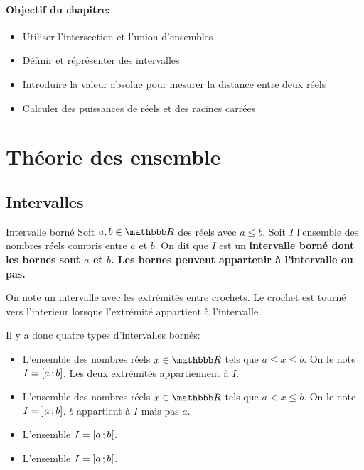 \documentclass[10pt,a4paper,openany,twoside,prof]{book}
\begin{document}
	\entetegal{}

	\vspace{-7mm}
	\paragraph*{Objectif du chapitre:}
	\begin{itemize}
		\vspace{-2mm}
		\setlength\itemsep{-1mm}
		\item Utiliser l'intersection et l'union d'ensembles
		\item Définir et réprésenter des intervalles
		\item Introduire la valeur absolue pour mesurer la distance entre deux réels
		\item Calculer des puissances de réels et des racines carrées
	\end{itemize}
	\vspace{-7mm}

\section{Théorie des ensemble}

\subsection{Intervalles}

\begin{defi}{Intervalle borné}{}
	Soit $a, b\in\R$ des réels avec $a\le b$. Soit $I$ l'ensemble des nombres réels compris entre $a$ et $b$. On dit que $I$ est un \bf{intervalle borné} dont les bornes sont $a$ et $b$. Les bornes peuvent appartenir à l'intervalle ou pas.
\end{defi}

\begin{notation}{}{}
	On note un intervalle avec les extrémités entre crochets. Le crochet est tourné vers l'interieur lorsque l'extrémité appartient à l'intervalle.

Il y a donc quatre types d'intervalles bornés:
	\begin{itemize}
		\item L'ensemble des nombres réels $x\in\R$ tels que $a\le x\le b$. On le note $I = \mathopen{[}a\mathclose{}\mathpunct{};b\mathclose{]}$. Les deux extrémités appartiennent à $I$.
		\item  L'ensemble des nombres réels $x\in\R$ tels que $a<x\le b$. On le note $I = \mathopen{]}a\mathclose{}\mathpunct{};b\mathclose{]}$. $b$ appartient à $I$ mais pas $a$.
		\item L'ensemble $I = \mathopen{[}a\mathclose{}\mathpunct{};b\mathclose{[}$.
		\item L'ensemble $I = \mathopen{]}a\mathclose{}\mathpunct{};b\mathclose{[}$.
	\end{itemize}
\end{notation}
\end{document}
